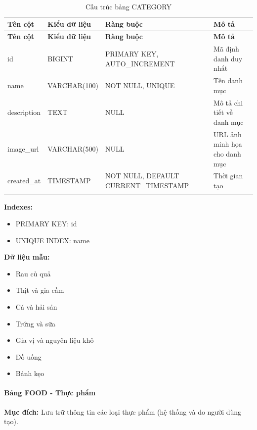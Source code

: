 \small
\begin{longtable}{|>{\raggedright\arraybackslash}p{3.5cm}|>{\raggedright\arraybackslash}p{3cm}|>{\raggedright\arraybackslash}p{4cm}|>{\raggedright\arraybackslash}p{4cm}|}
\hline
\textbf{Tên cột} & \textbf{Kiểu dữ liệu} & \textbf{Ràng buộc} & \textbf{Mô tả} \\
\hline
\endfirsthead
\hline
\textbf{Tên cột} & \textbf{Kiểu dữ liệu} & \textbf{Ràng buộc} & \textbf{Mô tả} \\
\hline
\endhead
id & BIGINT & PRIMARY KEY, AUTO\_INCREMENT & Mã định danh duy nhất \\
\hline
name & VARCHAR(100) & NOT NULL, UNIQUE & Tên danh mục \\
\hline
description & TEXT & NULL & Mô tả chi tiết về danh mục \\
\hline
image\_url & VARCHAR(500) & NULL & URL ảnh minh họa cho danh mục \\
\hline
created\_at & TIMESTAMP & NOT NULL, DEFAULT CURRENT\_TIMESTAMP & Thời gian tạo \\
\hline
\caption{Cấu trúc bảng CATEGORY}
\end{longtable}

\textbf{Indexes:}
\begin{itemize}
    \item PRIMARY KEY: id
    \item UNIQUE INDEX: name
\end{itemize}

\textbf{Dữ liệu mẫu:}
\begin{itemize}
    \item Rau củ quả
    \item Thịt và gia cầm
    \item Cá và hải sản
    \item Trứng và sữa
    \item Gia vị và nguyên liệu khô
    \item Đồ uống
    \item Bánh kẹo
\end{itemize}

\paragraph{Bảng FOOD - Thực phẩm}
\textbf{Mục đích:} Lưu trữ thông tin các loại thực phẩm (hệ thống và do người dùng tạo).

